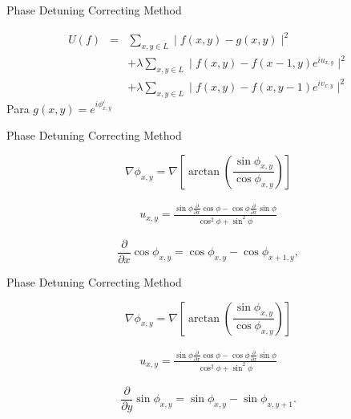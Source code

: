 \documentclass[]{beamer}
\begin{document}
\begin{frame}{Phase Detuning Correcting Method}
\begin{center}

\begin{eqnarray*}
U(f) &=& \sum_{x,y\in L} \mid f(x,y) - g(x,y) \mid ^2 \nonumber\\
      &  &+ \lambda \sum_{x,y\in L} 
  \mid f(x,y) - f(x-1,y) e^{i u_{x,y}} \mid^2 \nonumber\\
  & & + \lambda \sum_{x,y\in L} \mid f(x,y) - f(x,y-1) e^{i v_{x,y}} \mid^2
\end{eqnarray*}
Para $g(x,y)= e^{i \phi^\varepsilon_{x,y}}$

\end{center}
\end{frame}
\begin{frame}{Phase Detuning Correcting Method}
\begin{center}

\begin{equation*}
  \nabla \phi_{x,y} = \nabla \left[ \arctan \left(\frac{\sin{\phi_{x,y}}}	
      {\cos{\phi_{x,y}}}\right)\right]
\end{equation*}

\begin{eqnarray*}
  u_{x,y} = \frac{\sin \phi \frac{\partial}{\partial x}  \cos \phi - \cos 
  \phi \frac{\partial}{\partial x} \sin \phi}{ \cos^2 \phi + \sin^2 \phi }
\end{eqnarray*}

\begin{equation*}
  \frac{\partial}{\partial x} \cos\phi_{x,y} = 
  \cos\phi_{x,y}-\cos\phi_{x+1,y},
\end{equation*}

\end{center}
\end{frame}
\begin{frame}{Phase Detuning Correcting Method}
\begin{center}

\begin{equation*}
  \nabla \phi_{x,y} = \nabla \left[ \arctan \left(\frac{\sin{\phi_{x,y}}}	
      {\cos{\phi_{x,y}}}\right)\right]
\end{equation*}

\begin{eqnarray*}
  u_{x,y} = \frac{\sin \phi \frac{\partial}{\partial x}  \cos \phi - \cos 
  \phi \frac{\partial}{\partial x} \sin \phi}{ \cos^2 \phi + \sin^2 \phi }
\end{eqnarray*}

\begin{equation*}
  \frac{\partial}{\partial y} \sin\phi_{x,y} = 
  \sin\phi_{x,y}-\sin\phi_{x,y+1}.
\end{equation*}

\end{center}
\end{frame}

\end{document}
